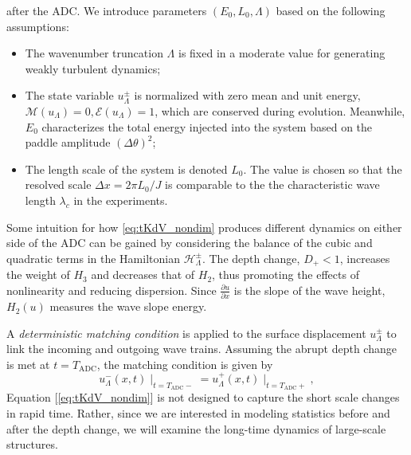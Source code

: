 \documentclass[9pt,twocolumn,twoside,lineno]{pnas-new}
\begin{document}
after the ADC. We introduce parameters $\left(E_{0},L_{0},\Lambda\right)$
based on the following assumptions:
\begin{itemize}
\item The wavenumber truncation $\Lambda$ is fixed in a moderate value
for generating weakly turbulent dynamics;
\item The state variable $u_{\Lambda}^{\pm}$ is normalized with zero mean
and unit energy, $\mathcal{M}\left(u_{\Lambda}\right)=0,\mathcal{E}\left(u_{\Lambda}\right)=1$,
which are conserved during evolution. Meanwhile, $E_{0}$ characterizes the total
energy injected into the system based on the paddle amplitude $\left(\Delta\theta\right)^{2}$;
\item The length scale of the system is denoted $L_{0}$. The value is
chosen so that the resolved scale $\Delta x=2\pi L_{0}/J$ is comparable
to the the characteristic wave length $\lambda_{c}$ in
the experiments.
\end{itemize}
Some intuition for how \eqref{eq:tKdV_nondim} produces different dynamics on either side of the ADC can be gained by considering the balance of the cubic and quadratic terms in the Hamiltonian $\mathcal{H}_{\Lambda}^{\pm}$. The depth change, $D_{+}<1$, increases the weight of $H_3$ and decreases that of $H_2$, thus promoting the effects of nonlinearity and reducing dispersion.
Since $\frac{\partial u}{\partial x}$ is the slope of the wave height, $H_{2}\left(u\right)$ measures the
wave slope energy.

A \emph{deterministic matching condition} is applied to the surface displacement $u_{\Lambda}^{\pm}$ to link the incoming and outgoing wave trains. Assuming the abrupt depth change is met at $t=T_{\mathrm{ADC}}$, the matching condition is given by
\[
u_{\Lambda}^{-}\left(x,t\right)\mid_{t=T_{\mathrm{ADC}}-}=u_{\Lambda}^{+}\left(x,t\right)\mid_{t=T_{\mathrm{ADC}}+},
\]
Equation [\ref{eq:tKdV_nondim}] is not designed to capture the short
scale changes in rapid time. 
Rather, since we are interested in modeling statistics before and after the depth change, we will examine the long-time dynamics of large-scale structures.
\end{document}
